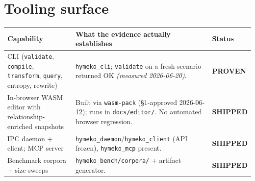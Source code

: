 \documentclass[11pt]{article}
\makeatletter
\newcommand{\sProven}{\textcolor{green!55!black}{\textbf{PROVEN}}}
\newcommand{\sShipped}{\textcolor{blue!65!black}{\textbf{SHIPPED}}}
\newcommand{\code}[1]{\texttt{\small #1}}
\newenvironment{captable}{%
  \begin{longtable}{@{}p{4.9cm}p{8.1cm}>{\raggedright\arraybackslash}p{2.5cm}@{}}
  \toprule
  \textbf{Capability} & \textbf{What the evidence actually establishes} & \textbf{Status}\\
  \midrule\endhead}{%
  \bottomrule\end{longtable}}
\makeatother
\begin{document}
\section{Tooling surface}
\begin{captable}
CLI (\code{validate}, \code{compile}, \code{transform}, \code{query}, entropy, rewrite)
  & \code{hymeko\_cli}; \code{validate} on a fresh scenario returned OK \emph{(measured 2026-06-20)}.
  & \sProven\\
\addlinespace
In-browser WASM editor with relationship-enriched snapshots
  & Built via \code{wasm-pack} (§1-approved 2026-06-12); runs in \code{docs/editor/}. No
    automated browser regression.
  & \sShipped\\
\addlinespace
IPC daemon + client; MCP server
  & \code{hymeko\_daemon}/\code{hymeko\_client} (API frozen), \code{hymeko\_mcp} present.
  & \sShipped\\
\addlinespace
Benchmark corpora + size sweeps
  & \code{hymeko\_bench/corpora/} + artifact generator.
  & \sShipped\\
\end{captable}
\end{document}
